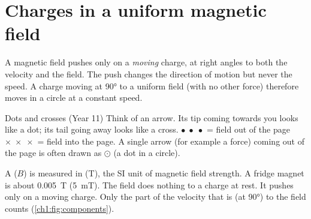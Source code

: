 \section{Charges in a uniform magnetic field}\label{ch1:sec:bfield}

\begin{bigidea}
A magnetic field pushes only on a \emph{moving} charge, at right angles to both
the velocity and the field. The push changes the direction of motion but never
the speed. A charge moving at \ang{90} to a uniform field (with no other force)
therefore moves in a circle at a constant speed.
\end{bigidea}

\begin{keywords}
\end{keywords}

\begin{refresher}{Dots and crosses (Year 11)}
Think of an arrow. Its tip coming towards you looks like a dot; its tail going
away looks like a cross. \quad $\bullet\;\bullet\;\bullet$ = field out of the
page \qquad $\times\;\times\;\times$ = field into the page.
A single arrow (for example a force) coming out of the page is often drawn as
$\odot$ (a dot in a circle).
\end{refresher}

A  ($B$) is measured in  (T), the SI unit of
magnetic field strength. A fridge magnet is about \qty{0.005}{T} (\qty{5}{mT}).
The field does nothing to a charge at rest. It pushes only on a moving charge.
Only the part of the velocity that is  (at \ang{90}) to the
field counts (\cref{ch1:fig:components}).

